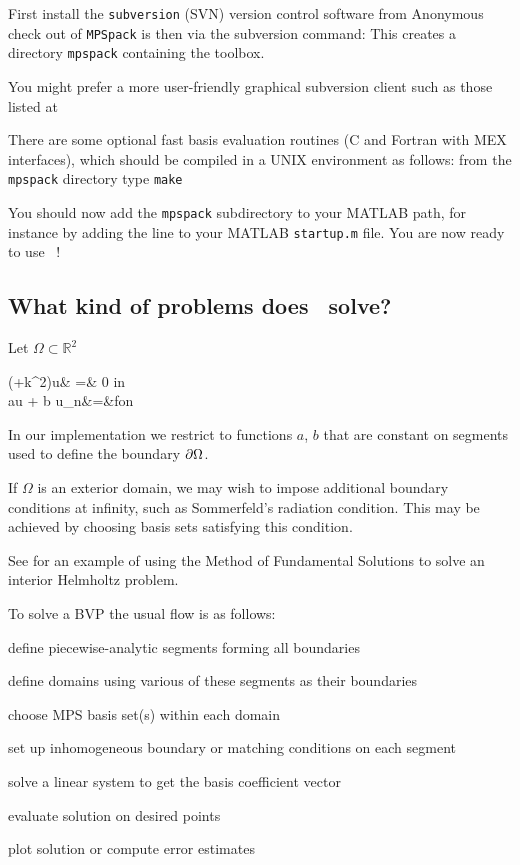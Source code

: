 \documentclass[12pt]{article}
\begin{document}
\item
First install the {\tt subversion} (SVN) version
control software from
Anonymous check out of {\tt MPSpack} is then via the subversion command:
This creates a directory {\tt mpspack} containing the toolbox.

You might prefer a more user-friendly graphical
subversion client such as those listed at
\een

There are some optional fast basis evaluation routines
(C and Fortran with MEX interfaces), which should be compiled
in a UNIX environment as follows:
from the {\tt mpspack} directory type {\tt make}

You should now add the {\tt mpspack}
subdirectory to your MATLAB path, for instance by adding the line
to your MATLAB {\tt startup.m} file.
You are now ready to use \mpspack\ !


\subsection{What kind of problems does \mpspack\ solve?}

Let $\Omega \subset \mathbb{R}^2$

\bea
(\Delta+k^2)u& =& 0 \qquad \mbox{in } \Omega\\
au + b u_n&=&f\qquad \mbox{on } \pO
\eea

In our implementation we restrict to functions $a$, $b$ that are
constant on segments used to define the boundary ${\partial\Omega}$.

If $\Omega$ is an exterior domain, we may wish to impose
additional boundary conditions at infinity, such as Sommerfeld's
radiation condition.
This may be achieved by choosing basis sets satisfying this condition.

See \cite{mfs} for
an example of using the Method of Fundamental Solutions to solve
an interior Helmholtz problem.

To solve a BVP the usual flow is as follows:

\ben
\item define piecewise-analytic segments forming all boundaries
\item define domains using various of these segments as their boundaries
\item choose MPS basis set(s) within each domain
\item set up inhomogeneous boundary or matching conditions on each segment
\item solve a %
linear system to get the basis coefficient vector
\item evaluate solution on desired points
\item plot solution or compute error estimates
\een
\end{document}
